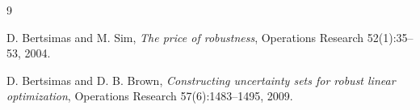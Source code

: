 \documentclass[11pt]{article}
\theoremstyle{definition}
\begin{document}

\begin{thebibliography}{9}

	D. Bertsimas and M. Sim,
	\textit{The price of robustness},
	Operations Research 52(1):35--53, 2004.

	D. Bertsimas and D. B. Brown,
	\textit{Constructing uncertainty sets for robust linear optimization},
	Operations Research 57(6):1483--1495, 2009.

\end{thebibliography}
\end{document}
